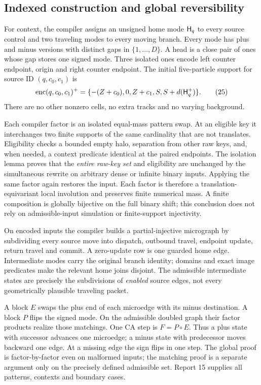 \documentclass[11pt,a4paper]{article}
\numberwithin{equation}{section}
\newcommand{\enc}{\operatorname{enc}}\newcommand{\Enc}{\operatorname{Enc}}
\begin{document}
\subsection{Indexed construction and global reversibility}
For context, the compiler assigns an unsigned home mode $\mathsf H_q$ to every
source control and two traveling modes to every moving branch. Every mode
has plus and minus versions with distinct gaps in $\{1,\ldots,D\}$. A
head is a close pair of ones whose gap stores one signed mode. Three isolated
ones encode left counter endpoint, origin and right counter endpoint. The
initial five-particle support for source ID $(q,c_0,c_1)$ is
\[
 \enc(q,c_0,c_1)^+=
 \{-(Z+c_0),0,Z+c_1,S,S+d(\HH_q^+)\}.                 \tag{25}\label{fpa:ls:eq:caenc}
\]
There are no other nonzero cells, no extra tracks and no varying background.

Each compiler factor is an isolated equal-mass pattern swap. At an eligible
key it interchanges two finite supports of the same cardinality that are not
translates. Eligibility checks a bounded empty halo, separation from other
raw keys, and, when needed, a context predicate identical at the paired
endpoints. The isolation lemma proves that the \emph{entire raw-key set} and
eligibility are unchanged by the simultaneous rewrite on arbitrary dense or
infinite binary inputs. Applying the same factor again restores the input.
Each factor is therefore a translation-equivariant local involution and
preserves finite numerical mass. A finite composition is globally bijective
on the full binary shift; this conclusion does not rely on admissible-input
simulation or finite-support injectivity.

On encoded inputs the compiler builds a partial-injective micrograph by
subdividing every source move into dispatch, outbound travel, endpoint
update, return travel and commit. A zero-update row is one guarded home edge.
Intermediate modes carry the original branch identity; domains and exact
image predicates make the relevant home joins disjoint. The admissible
intermediate states are precisely the subdivisions of \emph{enabled} source
edges, not every geometrically plausible traveling packet.

A block $E$ swaps the plus end of each microedge with its minus destination.
A block $P$ flips the signed mode. On the admissible doubled graph their
factor products realize those matchings. One CA step is $F=P\circ E$.
Thus a plus state with successor advances one microedge; a minus state with
predecessor moves backward one edge. At a missing edge the sign flips in
one step. The global proof is factor-by-factor even on malformed inputs;
the matching proof is a separate argument only on the precisely defined
admissible set. Report 15 supplies all patterns, contexts and boundary cases.
\end{document}
